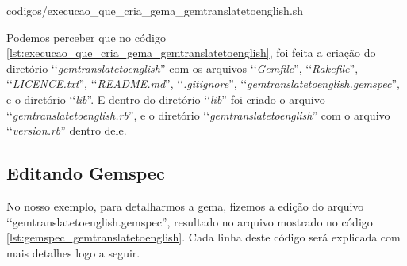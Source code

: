 %



{codigos/execucao_que_cria_gema_gemtranslatetoenglish.sh}

Podemos perceber que no código \ref{lst:execucao_que_cria_gema_gemtranslatetoenglish}, foi feita a criação do
diretório ‘‘\emph{gemtranslatetoenglish}'' com os arquivos ‘‘\emph{Gemfile}'', ‘‘\emph{Rakefile}'',
‘‘\emph{LICENCE.txt}'', ‘‘\emph{README.md}'', ‘‘\emph{.gitignore}'', ‘‘\emph{gemtranslatetoenglish.gemspec}'',
e o diretório ‘‘\emph{lib}''. E dentro do diretório ‘‘\emph{lib}'' foi criado o arquivo
‘‘\emph{gemtranslatetoenglish.rb}'', e o diretório ‘‘\emph{gemtranslatetoenglish}'' com o arquivo
‘‘\emph{version.rb}'' dentro dele.

\subsection{Editando Gemspec}
\label{subsection:editando_gemspec}


No nosso exemplo, para detalharmos a gema, fizemos a edição do arquivo ‘‘gemtranslatetoenglish.gemspec'',
resultado no arquivo mostrado no código \ref{lst:gemspec_gemtranslatetoenglish}.
Cada linha deste código será explicada com mais detalhes logo a seguir.

